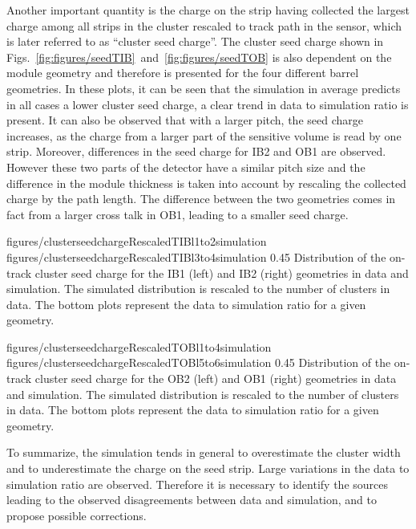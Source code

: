 Another important quantity is the charge on the strip having collected the largest charge among all strips in the cluster rescaled to track path in the sensor, which is later referred to as ``cluster seed charge''. The cluster seed charge shown in Figs.~\ref{fig:figures/seedTIB}~and~\ref{fig:figures/seedTOB} is also dependent on the module geometry and therefore is presented for the four different barrel geometries. In these plots, it can be seen that the simulation in average predicts in all cases a lower cluster seed charge, a clear trend in data to simulation ratio is present. It can also be observed that with a larger pitch, the seed charge increases, as the charge from a larger part of the sensitive volume is read by one strip. Moreover, differences in the seed charge for IB2 and OB1 are observed. However these two parts of the detector have a similar pitch size and the difference in the module thickness is taken into account by rescaling the collected charge by the path length. The difference between the two geometries comes in fact from a larger cross talk in OB1, leading to a smaller seed charge.


                 {figures/clusterseedchargeRescaledTIBl1to2simulation}
                 {figures/clusterseedchargeRescaledTIBl3to4simulation} %
                 {0.45}       %
                 { Distribution of the on-track cluster seed charge for the IB1 (left) and IB2 (right) geometries in data and simulation. The simulated distribution is rescaled to the number of clusters in data. The bottom plots represent the data to simulation ratio for a given geometry. }

                 {figures/clusterseedchargeRescaledTOBl1to4simulation}
                 {figures/clusterseedchargeRescaledTOBl5to6simulation} %
                 {0.45}       %
                 { Distribution of the on-track cluster seed charge for the OB2 (left) and OB1 (right) geometries in data and simulation. The simulated distribution is rescaled to the number of clusters in data. The bottom plots represent the data to simulation ratio for a given geometry. }


To summarize, the simulation tends in general to overestimate the cluster width and to underestimate the charge on the seed strip. Large variations in the data to simulation ratio are observed. Therefore it is necessary to identify the sources leading to the observed disagreements between data and simulation, and to propose possible corrections.

